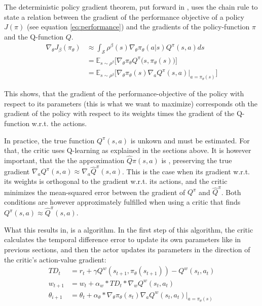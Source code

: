\noindent The deterministic policy gradient theorem, put forward in \cite{silver_deterministic_2014}, uses the chain rule to state a relation between the gradient of the performance objective of a policy $J(\pi)$ (see equation \ref{eq:performance}) and the gradients of the policy-function $\pi$ and the Q-function $Q$. 
\begin{align} \label{eq:policygradient}
	\nabla_{\theta}J_\beta(\pi_\theta) &\approx \int_{\mathcal{S}} \rho^\beta(s) \nabla_\theta \pi_{\theta}(a|s)Q^\pi(s,a) ds \nonumber \\
	    &= \mathds{E}_{s\sim\rho^\beta} \Big[ \nabla_\theta \pi_\theta Q^\pi \big(s,\pi_\theta(s)\big)   \Big] \nonumber \\
		&= \mathds{E}_{s\sim\rho^\beta} \Big[ \nabla_\theta \pi_{\theta}(s) \nabla_a Q^\pi(s,a) \Big|_{a=\pi_\theta(s)} \Big]
\end{align}

This shows, that the gradient of the performance-objective of the policy with respect to its parameters (this is what we want to maximize) corresponds oth the gradient of the policy with respect to its weights times the gradient of the Q-function w.r.t. the actions. 

In practice, the true function $Q^\pi(s,a)$ is unkown and must be estimated. For that, the critic uses Q-learning as explained in the sections above. It is however important, that the the approximation $\hat{Q}\pi(s,a)$ is , preserving the true gradient $\nabla_a Q^\pi(s,a) \approx \nabla_a \hat{Q}^\pi(s,a)$. This is the case when its gradient w.r.t. its weights is orthogonal to the gradient w.r.t. its actions, and the critic minimizes the mean-squared error between the gradient of $Q^\pi$ and $\hat{Q}^\pi$. Both conditions are however approximately fulfilled when using a critic that finds $Q^\pi(s,a) \approx \hat{Q}^\pi(s,a)$.

What this results in, is a  algorithm. In the first step of this algorithm, the critic calculates the temporal difference error to update its own parameters like in previous sections, and then the actor updates its parameters in the direction of the critic's action-value gradient:
\begin{align}
	TD_t    &= r_t + \gamma Q^w(s_{t+1}, \pi_{\theta}(s_{t+1})) - Q^w(s_t, a_t)\\
	w_{t+1} &= w_t + \alpha_w * TD_t * \nabla_w Q^w(s_t, a_t) \\
	\theta_{i+1} &= \theta_t + \alpha_\theta * \nabla_\theta \pi_\theta(s_t) \nabla_a Q^w(s_t,a_t) \big|_{a=\pi_\theta(s)}
\end{align}


